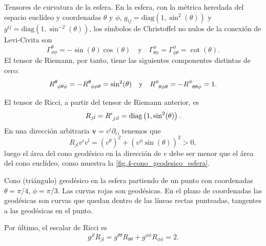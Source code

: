 \begin{example}
    {Tensores de curvatura de la esfera.
    \label{ej.4-tensores_esfera}}
    En la esfera, con la métrica heredada del espacio euclídeo y coordenadas \(\theta\) y \(\phi\), \(g_{ij} = \text{diag}\left(1, \sin^2(\theta)\right)\) y \(g^{ij} = \text{diag}\left(1, \sin^{-2}(\theta)\right)\), los símbolos de Christoffel no nulos de la conexión de Levi-Civita son
    \begin{equation*}
        \Gamma^\theta_{\phi\phi} = -\sin(\theta)\cos(\theta)\quad\text{y}\quad\Gamma^\phi_{\theta\phi} =  \Gamma^{\phi}_{\phi\theta} = \cot(\theta).
    \end{equation*}
    El tensor de Riemann, por tanto, tiene las siguientes componentes distintas de cero:
    \begin{equation*}
        \tensor{R}{^\theta_{\phi\theta\phi}} = - \tensor{R}{^\theta_{\phi\phi\theta}} = \sin^2(\theta)\quad\text{y}\quad\tensor{R}{^\phi_{\theta\phi\theta}} = - \tensor{R}{^\phi_{\theta\theta\phi}} = 1.
    \end{equation*}

    El tensor de Ricci, a partir del tensor de Riemann anterior, es
    \begin{equation*}
        R_{jl} = \tensor{R}{^i_{jil}} = \text{diag}\left(1, \sin^2(\theta)\right).
    \end{equation*}
    En una dirección arbitraria \(\mathbf{v} = v^i\partial_i\), tenemos que 
    \begin{equation*}
        R_{jl}v^i v^l = \left(v^\theta\right)^2 + \left(v^\phi\sin(\theta)\right)^2 > 0,
    \end{equation*}
    luego el área del cono geodésico en la dirección de \(v\) debe ser menor que el área del cono euclídeo, como muestra la \cref{fig.4-cono_geodesico_esfera}.

    \begin{figbox}
        {Cono (triángulo) geodésico en la esfera partiendo de un punto con coordenadas \(\theta=\pi/4\), \(\phi=\pi/3\). Las curvas rojas son geodésicas. En el plano de coordenadas las geodésicas son curvas que quedan dentro de las líneas rectas punteadas, tangentes a las geodésicas en el punto.
        \label{fig.4-cono_geodesico_esfera}}
        
    \end{figbox}

    Por último, el escalar de Ricci es 
    \begin{equation*}
        g^{jl}R_{jl} = g^{\theta\theta}R_{\theta\theta} + g^{\phi\phi}R_{\phi\phi} = 2.
    \end{equation*}

\end{example}



